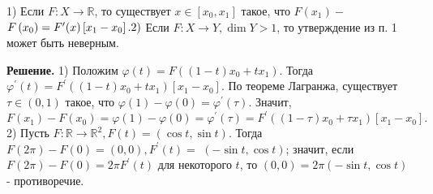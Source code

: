 \begin{task}
    1) Если $F: X \rightarrow \mathbb{R}$, то существует $x \in\left[x_0, x_1\right]$ такое, что $F\left(x_1\right)-$ $F\left(x_0\right)=F^{\prime}(x)\left[x_1-x_0\right].
    \\
    2)$ Если $F: X \rightarrow Y, \operatorname{dim} Y>1$, то утверждение из п. 1 может быть неверным.
    
    \textbf{Решение.} 1) Положим $\varphi(t)=F\left((1-t) x_0+t x_1\right)$. Тогда $\varphi^{\prime}(t)=F^{\prime}\left((1-t) x_0+t x_1\right)\left[x_1-x_0\right]$. По теореме Лагранжа, существует $\tau \in(0,1)$ такое, что $\varphi(1)-\varphi(0)=\varphi^{\prime}(\tau)$. Значит,
    $$
    F\left(x_1\right)-F\left(x_0\right)=\varphi(1)-\varphi(0)=\varphi^{\prime}(\tau)=F^{\prime}\left((1-\tau) x_0+\tau x_1\right)\left[x_1-x_0\right] .
    $$
    2) Пусть $F: \mathbb{R} \rightarrow \mathbb{R}^2, F(t)=(\cos t, \sin t)$. Тогда $F(2 \pi)-F(0)=(0,0), F^{\prime}(t)=$ $(-\sin t, \cos t)$; значит, если $F(2 \pi)-F(0)=2 \pi F^{\prime}(t)$ для некоторого $t$, то $(0,0)=2 \pi(-\sin t, \cos t)$ - противоречие.
    
\end{task}